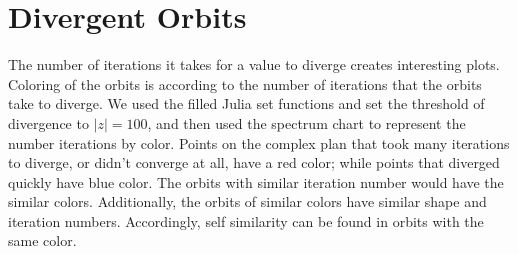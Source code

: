 \documentclass[letterpaper,11pt]{article}
\begin{document}
\section{Divergent Orbits}
The number of iterations it takes for a value to diverge creates interesting plots. Coloring of the orbits is according to the number of iterations that the orbits take to diverge. We used the filled Julia set functions and set the threshold of divergence to $|z| = 100$, and then used the spectrum chart to represent the number iterations by color. Points on the complex plan that took many iterations to diverge, or didn't converge at all, have a red color; while points that diverged quickly have blue color. The orbits with similar iteration number would have the similar colors. Additionally, the orbits of similar colors have similar shape and iteration numbers. Accordingly, self similarity can be found in orbits with the same color.
\end{document}
